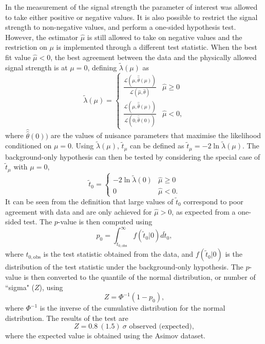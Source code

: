 In the measurement of the signal strength the parameter of interest
was allowed to take either positive or negative values. It is also
possible to restrict the signal strength to non-negative values, and
perform a one-sided hypothesis test. However, the estimator $\hat\mu$
is still allowed to take on negative values and the restriction on
$\mu$ is implemented through a different test statistic.
When the best fit value $\hat\mu < 0$, the best agreement between 
the data and the physically allowed signal strength is at $\mu = 0$,
defining $\tilde\lambda(\mu)$ as
\begin{equation}
\tilde\lambda(\mu) = 
    \begin{cases}
     \frac{\mathcal{L}(\mu, \hat{\hat\theta}(\mu))}{\mathcal{L}(\hat\mu, \hat\theta)} & \hat\mu \geq 0 \\
     \frac{\mathcal{L}(\mu, \hat{\hat\theta}(\mu))}{\mathcal{L}(0, \hat{\hat\theta}(0))} & \hat\mu < 0,
    \end{cases}
\end{equation}
where $\hat{\hat\theta}(0))$ are the values of nuisance parameters
that maximise the likelihood conditioned on $\mu=0$. Using $\tilde\lambda(\mu)$,
$\tilde{t}_\mu$ can be defined as $\tilde{t}_\mu = -2 \ln{\tilde\lambda(\mu)}$.
The background-only hypothesis can then be tested by considering the
special case of $\tilde{t}_\mu$ with $\mu=0$,
\begin{equation}
\tilde t_0 =
    \begin{cases}
     -2\ln{\tilde\lambda(0)} & \hat\mu \geq 0 \\
     0                       & \hat\mu < 0.
    \end{cases}
\end{equation}
It can be seen from the definition that large values of $\tilde t_0$
correspond to poor agreement with data and are only achieved for
$\hat\mu > 0$, as expected from a one-sided test. The $p$-value is
then computed using
\begin{equation}
p_0 = \int_{\tilde t_{0, \text{obs}}}^{\infty} f(\tilde t_0 | 0) d \tilde t_0,
\end{equation}
where $t_{0, \text{obs}}$ is the test statistic obtained from the data,
and $f(\tilde t_0 | 0)$ is the distribution of the test statistic 
under the background-only hypothesis. The $p$-value is then converted
to the quantile of the normal distribution, or number of ``sigma" ($Z$),
using
\begin{equation}
Z = \Phi^{-1}(1-p_0),
\end{equation}
where $\Phi^{-1}$ is the inverse of the cumulative distribution for
the normal distribution. The results of the test are
\begin{equation}
Z = 0.8~(1.5)~\sigma \text{ observed (expected)},
\end{equation}
where the expected value is obtained using the Asimov dataset.

